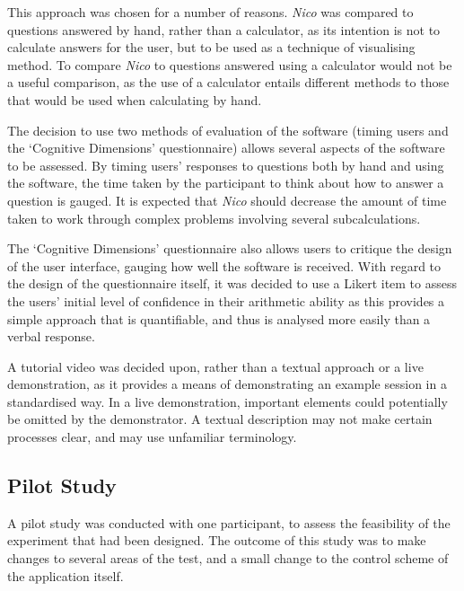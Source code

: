 \documentclass[12pt,twoside,notitlepage,xetex]{report}
\begin{document}
{%
This approach was chosen for a number of reasons.  \emph{Nico} was compared to questions answered by hand, rather than a calculator, as its intention is not to calculate answers for the user, but to be used as a technique of visualising method.  To compare \emph{Nico} to questions answered using a calculator would not be a useful comparison, as the use of a calculator entails different methods to those that would be used when calculating by hand.

The decision to use two methods of evaluation of the software (timing users and the `Cognitive Dimensions' questionnaire) allows several aspects of the software to be assessed.  By timing users' responses to questions both by hand and using the software, the time taken by the participant to think about how to answer a question is gauged.  It is expected that \emph{Nico} should decrease the amount of time taken to work through complex problems involving several subcalculations.

The `Cognitive Dimensions' questionnaire also allows users to critique the design of the user interface, gauging how well the software is received.  With regard to the design of the questionnaire itself, it was decided to use a Likert item to assess the users' initial level of confidence in their arithmetic ability as this provides a simple approach that is quantifiable, and thus is analysed more easily than a verbal response.

A tutorial video was decided upon, rather than a textual approach or a live demonstration, as it provides a means of demonstrating an example session in a standardised way.  In a live demonstration, important elements could potentially be omitted by the demonstrator.  A textual description may not make certain processes clear, and may use unfamiliar terminology.

\subsection{Pilot Study}

A pilot study was conducted with one participant, to assess the feasibility of the experiment that had been designed.  The outcome of this study was to make changes to several areas of the test, and a small change to the control scheme of the application itself.

}
\end{document}
